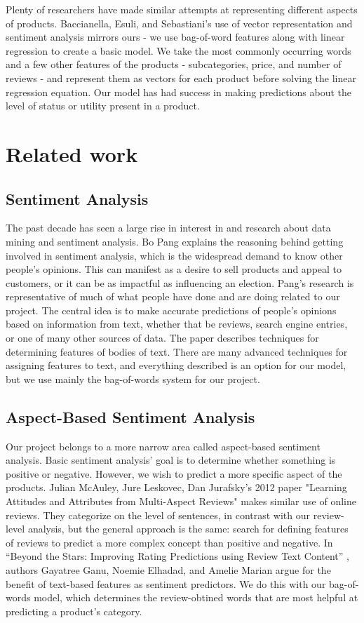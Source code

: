 \documentclass[dvips,12pt]{article}
\begin{document}
Plenty of researchers have made similar attempts at representing different aspects of products. Baccianella, Esuli, and Sebastiani's \cite{baccianella2009multi} use of vector representation and sentiment analysis mirrors ours - we use bag-of-word features along with linear regression to create a basic model. We take the most commonly occurring words and a few other features of the products - subcategories, price, and number of reviews - and represent them as vectors for each product before solving the linear regression equation. Our model has had success in making predictions about the level of status or utility present in a product.



\section{Related work}

\subsection{Sentiment Analysis}
The past decade has seen a large rise in interest in and research about data mining and sentiment analysis. Bo Pang\cite{pang2008opinion} explains the reasoning behind getting involved in sentiment analysis, which is the widespread demand to know other people's opinions. This can manifest as a desire to sell products and appeal to customers, or it can be as impactful as influencing an election. Pang's research is representative of much of what people have done and are doing related to our project. The central idea is to make accurate predictions of people's opinions based on information from text, whether that be reviews, search engine entries, or one of many other sources of data. The paper describes techniques for determining features of bodies of text. There are many advanced techniques for assigning features to text, and everything described is an option for our model, but we use mainly the bag-of-words system for our project.

\subsection{Aspect-Based Sentiment Analysis}
Our project belongs to a more narrow area called aspect-based sentiment analysis. Basic sentiment analysis' goal is to determine whether something is positive or negative. However, we wish to predict a more specific aspect of the products. Julian McAuley, Jure Leskovec, Dan Jurafsky's 2012 paper "Learning Attitudes and Attributes from Multi-Aspect Reviews" \cite{mcauley2012learning} makes similar use of online reviews. They categorize on the level of sentences, in contrast with our review-level analysis, but the general approach is the same: search for defining features of reviews to predict a more complex concept than positive and negative.  In “Beyond the Stars: Improving Rating Predictions using Review Text Content” \cite{ganu2009beyond}, authors Gayatree Ganu, Noemie Elhadad, and Amelie Marian argue for the benefit of text-based features as sentiment predictors. We do this with our bag-of-words model, which determines the review-obtined words that are most helpful at predicting a product’s category.
\end{document}
